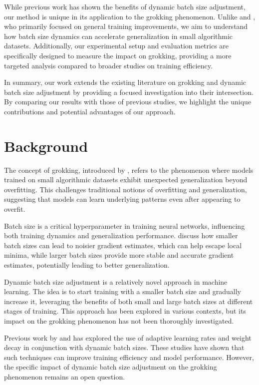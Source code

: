 \documentclass{article} %
\begin{document}
While previous work has shown the benefits of dynamic batch size adjustment, our method is unique in its application to the grokking phenomenon. Unlike \citet{loshchilov2017adamw} and \citet{kingma2014adam}, who primarily focused on general training improvements, we aim to understand how batch size dynamics can accelerate generalization in small algorithmic datasets. Additionally, our experimental setup and evaluation metrics are specifically designed to measure the impact on grokking, providing a more targeted analysis compared to broader studies on training efficiency.

In summary, our work extends the existing literature on grokking and dynamic batch size adjustment by providing a focused investigation into their intersection. By comparing our results with those of previous studies, we highlight the unique contributions and potential advantages of our approach.

\section{Background}
\label{sec:background}

The concept of grokking, introduced by \citet{power2022grokking}, refers to the phenomenon where models trained on small algorithmic datasets exhibit unexpected generalization beyond overfitting. This challenges traditional notions of overfitting and generalization, suggesting that models can learn underlying patterns even after appearing to overfit.

Batch size is a critical hyperparameter in training neural networks, influencing both training dynamics and generalization performance. \citet{goodfellow2016deep} discuss how smaller batch sizes can lead to noisier gradient estimates, which can help escape local minima, while larger batch sizes provide more stable and accurate gradient estimates, potentially leading to better generalization.

Dynamic batch size adjustment is a relatively novel approach in machine learning. The idea is to start training with a smaller batch size and gradually increase it, leveraging the benefits of both small and large batch sizes at different stages of training. This approach has been explored in various contexts, but its impact on the grokking phenomenon has not been thoroughly investigated.

Previous work by \citet{loshchilov2017adamw} and \citet{kingma2014adam} has explored the use of adaptive learning rates and weight decay in conjunction with dynamic batch sizes. These studies have shown that such techniques can improve training efficiency and model performance. However, the specific impact of dynamic batch size adjustment on the grokking phenomenon remains an open question.
\end{document}
